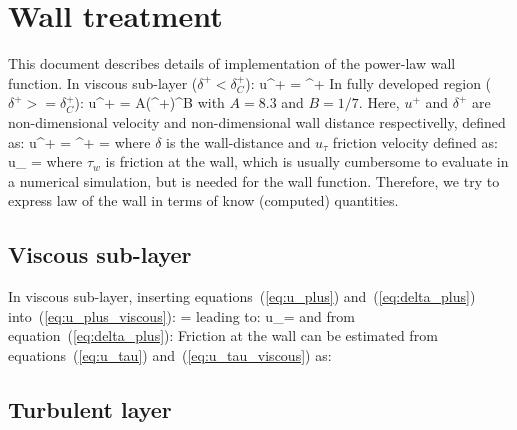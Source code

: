 \documentclass{report}
\begin{document}
  

\section{Wall treatment}

This document describes details of implementation of the power-law wall function.
In viscous sub-layer ($\delta^+ < \delta_C^+$):
%
\be
  u^+ = \delta^+
  \label{eq:u_plus_viscous}
\ee
%
In fully developed region ($\delta^+ >= \delta_C^+$):
% 
\be
  u^+ = A(\delta^+)^B
  \label{eq:u_plus_turbulent}
\ee
%
with $A=8.3$ and $B=1/7$. Here, $u^+$ and $\delta^+$ are non-dimensional velocity 
and non-dimensional wall distance respectivelly, defined as:
%
\be
  u^+ = 
  \label{eq:u_plus}
\ee
%
\be
  \delta^+ = 
  \label{eq:delta_plus}
\ee
%
where $\delta$ is the wall-distance and $u_{\tau}$ friction velocity defined as:
%
\be
  u_{\tau} = 
  \label{eq:u_tau}
\ee
%
where $\tau_w$ is friction at the wall, which is usually cumbersome to evaluate 
in a numerical simulation, but is needed for the wall function. Therefore, we 
try to express law of the wall in terms of know (computed) quantities.

\subsection{Viscous sub-layer}

In viscous sub-layer, inserting equations~(\ref{eq:u_plus}) and~(\ref{eq:delta_plus})
into~(\ref{eq:u_plus_viscous}):
%
\be
   = 
\ee
%
leading to:
%
\be
  u_\tau = 
  \label{eq:u_tau_viscous}
\ee
%
and from equation~(\ref{eq:delta_plus}):
%
\be
  \label{eq:delta_plus_viscous}
\ee
%
Friction at the wall can be estimated from equations~(\ref{eq:u_tau}) 
and~(\ref{eq:u_tau_viscous}) as:
%
\be
  \label{eq:tau_w_viscous}
\ee

\subsection{Turbulent layer}
\end{document}
